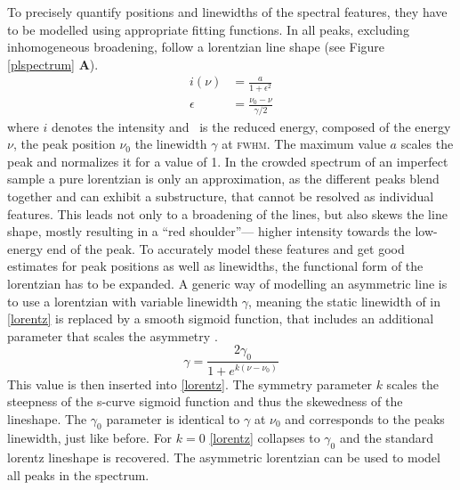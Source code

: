 To precisely quantify positions and linewidths of the spectral features, they have to be modelled using appropriate fitting functions. In \pl all peaks, excluding inhomogeneous broadening, follow a lorentzian line shape (see Figure \ref{plspectrum} \textbf{A}). 
\begin{align}
i(\nu)&= \frac{a}{1+\epsilon^2} \\
\epsilon &= \frac{\nu_0 - \nu}{\gamma /2}\label{lorentz}
\end{align}
where $i$ denotes the intensity and \epsilon\ is the reduced energy, composed of the energy $\nu$, the peak position $\nu_0$ the linewidth $\gamma$ at \textsc{fwhm}. The maximum value $a$ scales the peak and normalizes it for a value of 1. In the crowded spectrum of an imperfect sample a pure lorentzian is only an approximation, as the different peaks blend together and can exhibit a substructure, that cannot be resolved as individual features. This leads not only to a broadening of the lines, but also skews the line shape, mostly resulting in a ``red shoulder''--- higher intensity towards the low-energy end of the peak. To accurately model these features and get good estimates for peak positions as well as linewidths, the functional form of the lorentzian has to be expanded. A generic way of modelling an asymmetric line is to use a lorentzian with variable linewidth $\gamma$, meaning the static linewidth of in \ref{lorentz} is replaced by a smooth sigmoid function, that includes an additional parameter that scales the asymmetry \cite{stancik_simple_2008}.
\begin{equation} \gamma = \frac{2\gamma_0}{1+e^{k(\nu-\nu_0)}}\label{asymlorentz} \end{equation}
This value is then inserted into \eqref{lorentz}. The symmetry parameter $k$ scales the steepness of the s-curve sigmoid function and thus the skewedness of the lineshape. The $\gamma_0$ parameter is identical to $\gamma$ at $\nu_0$ and corresponds to the peaks linewidth, just like before. For $k=0$ \eqref{lorentz} collapses to $\gamma_0$ and the standard lorentz lineshape is recovered. The asymmetric lorentzian can be used to model all peaks in the \pl spectrum.


